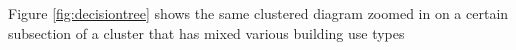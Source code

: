 Figure \ref{fig:decisiontree} shows the same clustered diagram zoomed in on a certain subsection of a cluster that has mixed various building use types